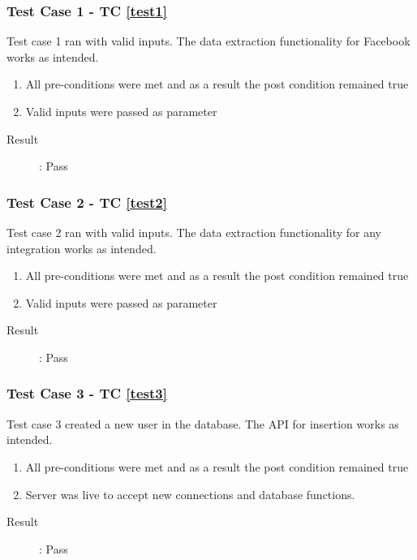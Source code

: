 \documentclass{article}
\begin{document}
\subsubsection{Test Case 1 - TC \ref{test1}}
Test case 1 ran with valid inputs.
The data extraction functionality for Facebook works as intended.
\begin{enumerate}
	\item All pre-conditions were met and as a result the post condition remained true
	\item Valid inputs were passed as parameter 
\end{enumerate}
\begin{description}
	\item [Result]: Pass 
\end{description}

\subsubsection{Test Case 2 - TC \ref{test2}}
Test case 2 ran with valid inputs.
The data extraction functionality for any integration works as intended.
\begin{enumerate}
	\item All pre-conditions were met and as a result the post condition remained true
	\item Valid inputs were passed as parameter 
\end{enumerate}

\begin{description}
	\item [Result]: Pass 
\end{description}

\subsubsection{Test Case 3 - TC \ref{test3}}
Test case 3 created a new user in the database.
The API for insertion works as intended.
\begin{enumerate}
	\item All pre-conditions were met and as a result the post condition remained true
	\item Server was live to accept new connections and database functions.
\end{enumerate}

\begin{description}
	\item [Result]: Pass 
\end{description}
\end{document}

